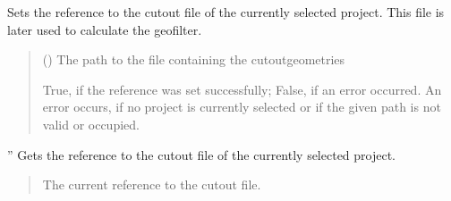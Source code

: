\documentclass[letterpaper,10pt,english]{sphinxmanual}
\begin{document}
\begin{fulllineitems}
\begin{fulllineitems}
\label{\detokenize{apidoc/src.osm_configurator.control:src.osm_configurator.control.cut_out_controller.CutOutController.set_cut_out_reference}}
\pysigstartsignatures
{}
\pysigstopsignatures
\sphinxAtStartPar
Sets the reference to the cut\sphinxhyphen{}out file of the currently selected project.
This file is later used to calculate the geofilter.
\begin{quote}\begin{description}
\sphinxAtStartPar
{} () \textendash{} The path to the file containing the cut\sphinxhyphen{}out\sphinxhyphen{}geometries

\sphinxAtStartPar
True, if the reference was set successfully; False, if an error occurred. An error occurs, if no project is currently selected or if the given path is not valid or occupied.

\sphinxAtStartPar
{}

\end{description}\end{quote}

\end{fulllineitems}


\begin{fulllineitems}
\label{\detokenize{apidoc/src.osm_configurator.control:src.osm_configurator.control.cut_out_controller.CutOutController.get_cut_out_reference}}
\pysigstartsignatures
{}
\pysigstopsignatures
\sphinxAtStartPar
”
Gets the reference to the cut\sphinxhyphen{}out file of the currently selected project.
\begin{quote}\begin{description}
\sphinxAtStartPar
The current reference to the cut\sphinxhyphen{}out file.

\sphinxAtStartPar
{}

\end{description}\end{quote}

\end{fulllineitems}


\end{fulllineitems}
\end{document}
